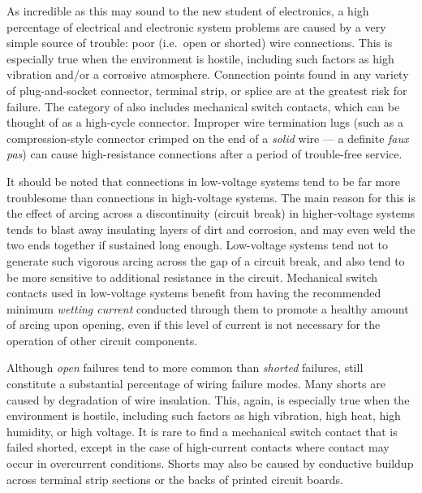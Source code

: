 \stopsubsection

\startsubsection[title={Bad Wire
Connections},reference={sec:xtocid157909715}]

As incredible as this may sound to the new student of electronics, a
high percentage of electrical and electronic system problems are caused
by a very simple source of trouble: poor (i.e.~open or shorted) wire
connections. This is especially true when the environment is hostile,
including such factors as high vibration and/or a corrosive atmosphere.
Connection points found in any variety of plug-and-socket connector,
terminal strip, or splice are at the greatest risk for failure. The
category of  also includes mechanical switch
contacts, which can be thought of as a high-cycle connector. Improper
wire termination lugs (such as a compression-style connector crimped on
the end of a {\em solid} wire --- a definite {\em faux pas}) can cause
high-resistance connections after a period of trouble-free service.

It should be noted that connections in low-voltage systems tend to be
far more troublesome than connections in high-voltage systems. The main
reason for this is the effect of arcing across a discontinuity (circuit
break) in higher-voltage systems tends to blast away insulating layers
of dirt and corrosion, and may even weld the two ends together if
sustained long enough. Low-voltage systems tend not to generate such
vigorous arcing across the gap of a circuit break, and also tend to be
more sensitive to additional resistance in the circuit. Mechanical
switch contacts used in low-voltage systems benefit from having the
recommended minimum {\em wetting current} conducted through them to
promote a healthy amount of arcing upon opening, even if this level of
current is not necessary for the operation of other circuit components.

Although {\em open} failures tend to more common than {\em shorted}
failures,  still constitute a substantial percentage
of wiring failure modes. Many shorts are caused by degradation of wire
insulation. This, again, is especially true when the environment is
hostile, including such factors as high vibration, high heat, high
humidity, or high voltage. It is rare to find a mechanical switch
contact that is failed shorted, except in the case of high-current
contacts where contact  may occur in overcurrent
conditions. Shorts may also be caused by conductive buildup across
terminal strip sections or the backs of printed circuit boards.

